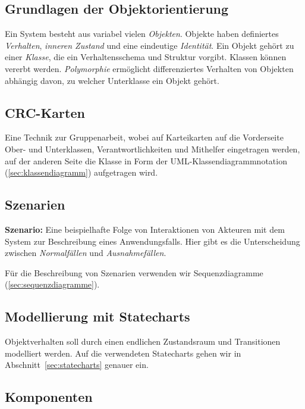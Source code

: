 \documentclass[a4paper,parskip=half*,DIV=7,fontsize=11pt]{scrartcl}
\begin{document}

\subsection{Grundlagen der Objektorientierung}

Ein System besteht aus variabel vielen \emph{Objekten}. Objekte haben definiertes \emph{Verhalten}, \emph{inneren Zustand} und eine eindeutige \emph{Identität}. Ein Objekt gehört zu einer \emph{Klasse}, die ein Verhaltensschema und Struktur vorgibt. Klassen können vererbt werden. \emph{Polymorphie} ermöglicht differenziertes Verhalten von Objekten abhängig davon, zu welcher Unterklasse ein Objekt gehört.

\subsection{CRC-Karten}

Eine Technik zur Gruppenarbeit, wobei auf Karteikarten auf die Vorderseite Ober- und Unterklassen, Verantwortlichkeiten und Mithelfer eingetragen werden, auf der anderen Seite die Klasse in Form der UML-Klassendiagrammnotation (\ref{sec:klassendiagramm}) aufgetragen wird.

\subsection{Szenarien}

\textbf{Szenario:} Eine beispielhafte Folge von Interaktionen von Akteuren mit dem System zur Beschreibung eines Anwendungsfalls.
Hier gibt es die Unterscheidung zwischen \emph{Normalfällen} und \emph{Ausnahmefällen}.

Für die Beschreibung von Szenarien verwenden wir Sequenzdiagramme (\ref{sec:sequenzdiagramme}).

\subsection{Modellierung mit Statecharts}

Objektverhalten soll durch einen endlichen Zustandsraum und Transitionen modelliert werden. Auf die verwendeten Statecharts gehen wir in Abschnitt~\ref{sec:statecharts} genauer ein.

\subsection{Komponenten}
\end{document}
